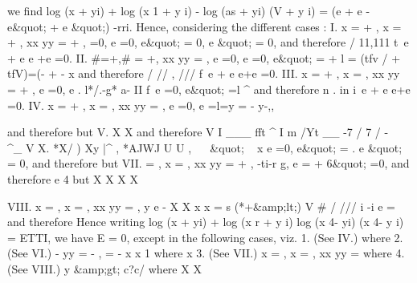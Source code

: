 \documentclass[11pt,a4paper]{book}
\begin{document}

we
find
log (x + yi) + log (x
1 + y i) - log (as + yi) (V + y i) = (e + e -
e\&quot; + e
\&quot;)
-rri.
Hence,
considering the
different cases
:
I.
x
= +
,
x = +
,
xx
yy = +
,
=0,
e
=0,
e\&quot; = 0,
e
\&quot; = 0,
and therefore
/
11,111
t\
e + e
e +e
=0.
II.
\#=+,\# = +,
xx
yy =
,
e
=0,
e
=0,
e\&quot; = + l = (tfv
/ + tfV)=(- + -
\x
x
and
therefore
/
//
,
///
f\
e + e
e+e
=0.
III.
x = +
,
x =
,
xx
yy = +
,
e
=0,
e
. l*/.-g*
a-
II
f\
e
=0,
e\&quot; =l
^
and
therefore
n
.
in
i\
e + e
e+e
=0.
IV.
x = +
,
x =
,
xx
yy =
,
e
=0,
e =l=y = - y-,,


and
therefore
but
V.
X
\X
X
and therefore
V
I
___
fft
^
I
m /Yt
__
-7 / 7 /
-~ ^_
V X.
*X/
)
Xy
|^
,
*AJWJ
U U
,
~~
\&quot; ~
x
e
=0,
e\&quot; =
.
e
\&quot; = 0,
and therefore
but
VII.
=
,
x =
,
xx
yy = +
,
-ti-r
g,
e
= +
6\&quot; =0,
and therefore
e 4
but
X
X
X
X


VIII.
x
=
,
x =
,
xx
yy =
,
y
e
-
X
X
x
x
=
s
(*+\&amp;lt;)
V
\# /
///
i
-i
e
=
and
therefore
Hence writing
log (x + yi) + log (x
r + y i)
log (x 4- yi) (x
4- y i) = ETTI,
we have E = 0, except in the following
cases,
viz.
1.
(See IV.)
where
2.
(See VI.)
- yy = -
,
= -
x
\x
x 1
where
\x
x
3.
(See
VII.)
x =
, x =
, xx
yy =
where
4.
(See
VIII.)
y
\&amp;gt;
c?c/
where
X
X

\end{document}
